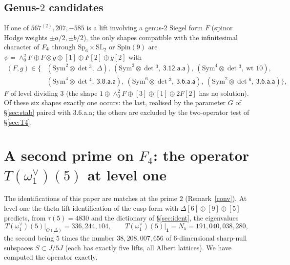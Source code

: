 \documentclass[11pt]{amsart}
\theoremstyle{definition}
\begin{document}
\subsection{Genus-$2$ candidates} If one of $567^{(2)},207,-585$ is a lift involving a genus-$2$ Siegel form $F$ (spinor Hodge weights $\pm a/2,\pm b/2$), the only shapes compatible with the infinitesimal character of $F_4$ through $\mathrm{Sp}_6\times\mathrm{SL}_2$ or $\mathrm{Spin}(9)$ are $\psi=\wedge^2_0F\oplus F\otimes g\oplus[1]\oplus F[2]\oplus g[2]$ with
\begin{align*}(F,g)\in\{&(\mathrm{Sym}^2\!\otimes\det{}^3,\ \Delta),\ (\mathrm{Sym}^2\!\otimes\det{}^3,\ \textsf{3.12.a.a}),\ (\mathrm{Sym}^4\!\otimes\det{}^3,\ \text{wt }10),\\ &(\mathrm{Sym}^4\!\otimes\det{}^4,\ \textsf{3.8.a.a}),\ (\mathrm{Sym}^6\!\otimes\det{}^3,\ \textsf{3.6.a.a}),\ (\mathrm{Sym}^2\!\otimes\det{}^6,\ \textsf{3.6.a.a})\},\end{align*}
$F$ of level dividing $3$ (the shape $1\oplus\wedge^2_0F\oplus[3]\oplus[1]\oplus2F[2]$ has no solution). Of these six shapes exactly one occurs: the last, realised by the parameter $G$ of \S\ref{sec:stab} paired with \textsf{3.6.a.a}; the others are excluded by the two-operator test of \S\ref{sec:T4}.

\section{A second prime on $F_4$: the operator $T(\omega_1^\vee)(5)$ at level one}\label{sec:five}
The identifications of this paper are matches at the prime $2$ (Remark~\ref{conv}). At level one the theta-lift identification of the cusp form with $\Delta[6]\oplus[9]\oplus[5]$ predicts, from $\tau(5)=4830$ and the dictionary of \S\ref{sec:ident}, the eigenvalues
\[T(\omega_1^\vee)(5)\big|_{\Theta(\Delta)}=336{,}244{,}104,\qquad T(\omega_1^\vee)(5)\big|_{\mathbf 1}=N_5=191{,}040{,}038{,}280,\]
the second being $5$ times the number $38{,}208{,}007{,}656$ of $6$-dimensional sharp-null subspaces $S\subset J/5J$ (each has exactly five lifts, all Albert lattices). We have computed the operator exactly.
\end{document}
